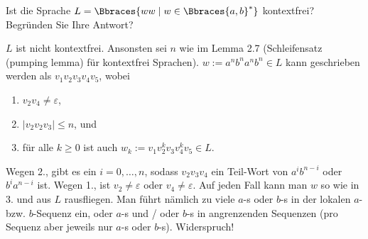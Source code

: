 
\begin{exercise}

Ist die Sprache $L = \Bbraces{w w \mid w \in \Bbraces{a, b}^\ast}$ kontextfrei?
Begründen Sie Ihre Antwort?

\end{exercise}


\begin{solution}

$L$ ist nicht kontextfrei.
Ansonsten sei $n$ wie im Lemma 2.7 (Schleifensatz (pumping lemma) für kontextfrei Sprachen).
$w := a^n b^n a^n b^n \in L$ kann geschrieben werden als $v_1 v_2 v_3 v_4 v_5$, wobei

\begin{enumerate}
    \item $v_2 v_4 \neq \varepsilon$,
    \item $|v_2 v_2 v_3| \leq n$, und
    \item für alle $k \geq 0$ ist auch $w_k := v_1 v_2^k v_3 v_4^k v_5 \in L$.
\end{enumerate}

Wegen 2., gibt es ein $i = 0, \dots, n$, sodass $v_2 v_3 v_4$ ein Teil-Wort von $a^i b^{n-i}$ oder $b^i a^{n-i}$ ist.
Wegen 1., ist $v_2 \neq \varepsilon$ oder $v_4 \neq \varepsilon$.
Auf jeden Fall kann man $w$ so wie in 3.  und aus $L$ rausfliegen.
Man führt nämlich zu viele $a$-s oder $b$-s in der lokalen $a$- bzw. $b$-Sequenz ein, oder $a$-s und / oder $b$-s in angrenzenden Sequenzen (pro Sequenz aber jeweils nur $a$-s oder $b$-s).
Widerspruch!

\end{solution}

